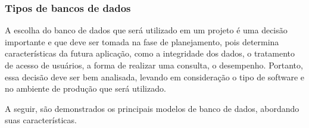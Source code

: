 \subsubsection{Tipos de bancos de dados}

\par A escolha do banco de dados que será utilizado em um projeto é uma decisão importante e que deve ser tomada na fase de planejamento, pois determina características da futura aplicação, como a integridade dos dados, o tratamento de acesso de usuários, a forma de realizar uma consulta, o desempenho. Portanto, essa decisão deve ser bem analisada, levando em consideração o tipo de software e no ambiente de produção que será utilizado.

\par A seguir, são demonstrados os principais modelos de banco de dados, abordando suas características.
